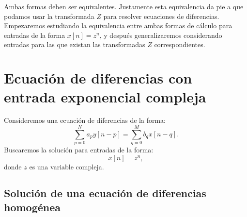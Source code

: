 \documentclass[11pt,a4paper,openany]{book}
\begin{document}
Ambas formas deben ser equivalentes. Justamente esta equivalencia da pie a que podamos usar la transformada $Z$ para resolver ecuaciones de diferencias. Empezaremos estudiando la equivalencia entre ambas formas de c\'{a}lculo para entradas de la forma $x[n] = z^{n}$, y despu\'{e}s generalizaremos considerando entradas para las que existan las transformadas $Z$ correspondientes.

\section{Ecuaci\'{o}n de diferencias con entrada exponencial compleja}

Consideremos una ecuaci\'{o}n de diferencias de la forma:
\begin{equation}
	\sum_{p=0}^{N}a_{p} y[n-p] = \sum_{q=0}^{M}b_{q} x[n-q].
\end{equation}
Buscaremos la soluci\'{o}n para entradas de la forma:
\begin{equation}
	x[n] = z^n,
\end{equation}
donde $z$ es una variable compleja.

\subsection{Soluci\'{o}n de una ecuaci\'{o}n de diferencias homog\'{e}nea}
\end{document}
